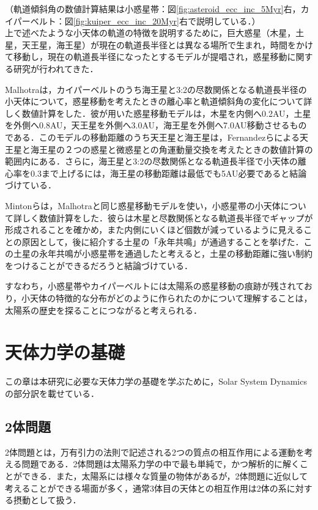 \documentclass[11pt,a4paper,oneside,onecolumn]{jreport}
\begin{document}
（軌道傾斜角の数値計算結果は小惑星帯：図\ref{fig:asteroid_ecc_inc_5Myr}右，カイパーベルト：図\ref{fig:kuiper_ecc_inc_20Myr}右で説明している．）
\\

上で述べたような小天体の軌道の特徴を説明するために，巨大惑星（木星，土星，天王星，海王星）が現在の軌道長半径とは異なる場所で生まれ，時間をかけて移動し，現在の軌道長半径になったとするモデルが提唱され，惑星移動に関する研究が行われてきた．

Malhotraは，カイパーベルトのうち海王星と3:2の尽数関係となる軌道長半径の小天体について，惑星移動を考えたときの離心率と軌道傾斜角の変化について詳しく数値計算をした\cite{Malhotra}．彼が用いた惑星移動モデルは，木星を内側へ0.2AU，土星を外側へ0.8AU，天王星を外側へ3.0AU，海王星を外側へ7.0AU移動させるものである．このモデルの移動距離のうち天王星と海王星は，Fernandezらによる天王星と海王星の２つの惑星と微惑星との角運動量交換を考えたときの数値計算\cite{Fernandez}の範囲内にある．さらに，海王星と3:2の尽数関係となる軌道長半径で小天体の離心率を0.3まで上げるには，海王星の移動距離は最低でも5AU必要であると結論づけている．

Mintonらは，Malhotraと同じ惑星移動モデルを使い，小惑星帯の小天体について詳しく数値計算をした\cite{Minton}．彼らは木星と尽数関係となる軌道長半径でギャップが形成されることを確かめ，また内側にいくほど個数が減っているように見えることの原因として，後に紹介する土星の「永年共鳴」が通過することを挙げた．この土星の永年共鳴が小惑星帯を通過したと考えると，土星の移動距離に強い制約をつけることができるだろうと結論づけている．

すなわち，小惑星帯やカイパーベルトには太陽系の惑星移動の痕跡が残されており，小天体の特徴的な分布がどのように作られたのかについて理解することは，太陽系の歴史を探ることにつながると考えられる．


\chapter{天体力学の基礎}
この章は本研究に必要な天体力学の基礎を学ぶために，Solar System Dynamics\cite{SSD}の部分訳を載せている．

\section{2体問題 \label{sec:2body}}
2体問題とは，万有引力の法則で記述される2つの質点の相互作用による運動を考える問題である．2体問題は太陽系力学の中で最も単純で，かつ解析的に解くことができる．また，太陽系には様々な質量の物体があるが，2体問題に近似して考えることができる場面が多く，通常3体目の天体との相互作用は2体の系に対する摂動として扱う．
\end{document}
